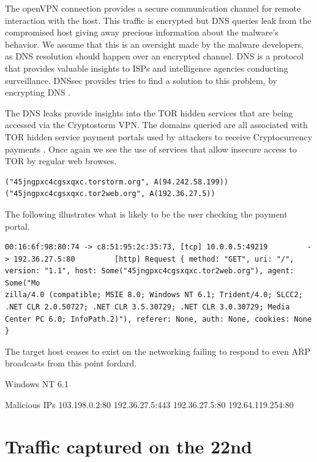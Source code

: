 \documentclass[11pt]{diazessay} %
\begin{document}
The openVPN connection provides a secure communication channel for remote interaction with the host. This traffic is encrypted but DNS queries leak from the compromised host giving away precious information about the malware's behavior. We assume that this is an oversight made by the malware developers, as DNS resolution should happen over an encrypted channel.  DNS is a protocol that provides valuable insights to ISPs and intelligence agencies conducting surveillance. DNSsec provides tries to find a solution to this problem, by encrypting DNS \cite{dnssec}. 

The DNS leaks provide insights into the TOR hidden services that are being accessed via the Cryptostorm VPN. The domains queried are all associated with TOR hidden service payment portals used by attackers to receive Cryptocurrency payments \cite{hybrid}. Once again we see the use of services that allow insecure access to TOR by regular web browses. 

\begin{lstlisting}
("45jngpxc4cgsxqxc.torstorm.org", A(94.242.58.199)) 
("45jngpxc4cgsxqxc.tor2web.org", A(192.36.27.5))
\end{lstlisting}

The following illustrates what is likely to be the user checking the payment portal.
\begin{lstlisting}
00:16:6f:98:80:74 -> c8:51:95:2c:35:73, [tcp] 10.0.0.5:49219         -> 192.36.27.5:80         [http] Request { method: "GET", uri: "/", version: "1.1", host: Some("45jngpxc4cgsxqxc.tor2web.org"), agent: Some("Mo
zilla/4.0 (compatible; MSIE 8.0; Windows NT 6.1; Trident/4.0; SLCC2; .NET CLR 2.0.50727; .NET CLR 3.5.30729; .NET CLR 3.0.30729; Media Center PC 6.0; InfoPath.2)"), referer: None, auth: None, cookies: None }
\end{lstlisting}

The target host ceases to exist on the networking failing to respond to even ARP broadcasts from this point fordard. 


Windows NT 6.1

Malicious IPs 
103.198.0.2:80
192.36.27.5:443
192.36.27.5:80
192.64.119.254:80



\section*{Traffic captured on the 22nd}
\end{document}
